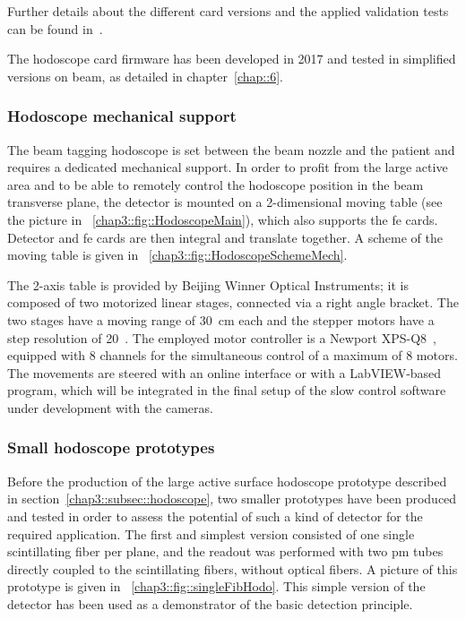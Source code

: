 Further details about the different card versions and the applied validation tests can be found in~\cite{Chen2017}.

The hodoscope card firmware has been developed in 2017 and tested in simplified versions on beam, as detailed in chapter~\ref{chap::6}.
           

\subsubsection{Hodoscope mechanical support}\label{chap3::subsubsec::HodoMechanics}

The beam tagging hodoscope is set between the beam nozzle and the patient and requires a dedicated mechanical support. In order to profit from the large active area and to be able to remotely control the hodoscope position in the beam transverse plane, the detector is mounted on a 2-dimensional moving table (see the picture in \figurename~\ref{chap3::fig::HodoscopeMain}), which also supports the \gls{fe} cards. Detector and \gls{fe} cards are then integral and translate together. A scheme of the moving table is given in \figurename~\ref{chap3::fig::HodoscopeSchemeMech}.

The 2-axis table is provided by Beijing Winner Optical Instruments; it is composed of two motorized linear stages, connected via a right angle bracket. The two stages have a moving range of 30~cm each and the stepper motors have a step resolution of 20~\charmum. The employed motor controller is a Newport XPS-Q8~\parencite{Newport2017}, equipped with 8 channels for the simultaneous control of a maximum of 8 motors. The movements are steered with an online interface or with a LabVIEW-based program, which will be integrated in the final setup of the slow control software under development with the cameras.

\subsubsection{Small hodoscope prototypes}\label{chap3::subsubsec::SmallHodoProto}
Before the production of the large active surface hodoscope prototype described in section~\ref{chap3::subsec::hodoscope}, two smaller prototypes have been produced and tested in order to assess the potential of such a kind of detector for the required application. The first and simplest version consisted of one single scintillating fiber per plane, and the readout was performed with two \gls{pm} tubes directly coupled to the scintillating fibers, without optical fibers. A picture of this prototype is given in \figurename~\ref{chap3::fig::singleFibHodo}. This simple version of the detector has been used as a demonstrator of the basic detection principle.


